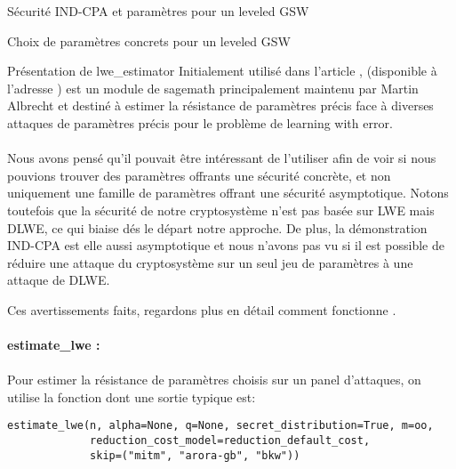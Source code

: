 \begin{section}{Sécurité IND-CPA et paramètres pour un leveled GSW}
\begin{subsection}{Choix de paramètres concrets pour un leveled GSW}
\begin{subsubsection}{Présentation de lwe\_estimator}
Initialement utilisé dans l'article \cite{EPRINT:AlbPlaSco15},  (disponible à l'adresse
\cite{estimator}) est un module de sagemath principalement maintenu par Martin Albrecht et destiné à estimer la résistance
de paramètres précis face à diverses attaques de paramètres précis pour le problème de learning with error.

\paragraph{}
Nous avons pensé qu'il pouvait être intéressant de l'utiliser afin de voir si nous pouvions trouver des paramètres
offrants une sécurité concrète, et non uniquement une famille de paramètres offrant une sécurité asymptotique.
Notons toutefois que la sécurité de notre cryptosystème n'est pas basée sur LWE mais DLWE, ce qui biaise dés le départ 
notre approche. De plus, la démonstration IND-CPA est elle aussi asymptotique et nous n'avons pas vu si il est possible 
de réduire une attaque du cryptosystème sur un seul jeu de paramètres à une attaque de DLWE.

Ces avertissements faits, regardons plus en détail comment fonctionne  .


\paragraph{}
\textbf{estimate\_lwe :}

\paragraph{}
Pour estimer la résistance de paramètres choisis sur un panel d'attaques, on utilise la fonction 
dont une sortie typique est:

\flushleft
	
	\begin{lstlisting}
estimate_lwe(n, alpha=None, q=None, secret_distribution=True, m=oo,
             reduction_cost_model=reduction_default_cost,
             skip=("mitm", "arora-gb", "bkw"))
        \end{lstlisting}
	

\end{subsubsection}
\end{subsection}
\end{section}
